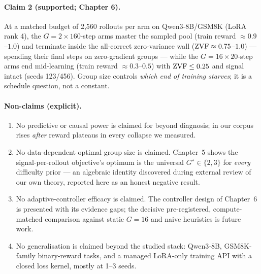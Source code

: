\paragraph{Claim 2 (supported; Chapter 6).} At a matched budget of 2{,}560
rollouts per arm on Qwen3-8B/GSM8K (LoRA rank 4), the $G{=}2\times160$-step
arms master the sampled pool (train reward $\approx0.9$--$1.0$) and terminate
inside the all-correct zero-variance wall ($\mathrm{ZVF}\approx0.75$--$1.0$) ---
spending their final steps on zero-gradient groups --- while the
$G{=}16\times20$-step arms end mid-learning (train reward
$\approx0.3$--$0.5$) with $\mathrm{ZVF}\le0.25$ and signal intact
(seeds 123/456). Group size controls \emph{which end
of training starves}; it is a schedule question, not a constant.

\paragraph{Non-claims (explicit).}
\begin{enumerate}[leftmargin=1.6em,itemsep=1pt]
  \item No predictive or causal power is claimed for \ZVF{} beyond diagnosis;
        in our corpus \ZVF{} rises \emph{after} reward plateaus in every
        collapse we measured.
  \item No data-dependent optimal group size is claimed. Chapter~5 shows the
        signal-per-rollout objective's optimum is the universal
        $G^\star\in\{2,3\}$ for \emph{every} difficulty prior --- an algebraic
        identity discovered during external review of our own theory, reported
        here as an honest negative result.
  \item No adaptive-controller efficacy is claimed. The controller design of
        Chapter~6 is presented with its evidence gaps; the decisive
        pre-registered, compute-matched comparison against static $G{=}16$ and
        naive heuristics is future work.
  \item No generalisation is claimed beyond the studied stack: Qwen3-8B,
        GSM8K-family binary-reward tasks, and a managed LoRA-only training API
        with a closed loss kernel, mostly at 1--3 seeds.
\end{enumerate}


